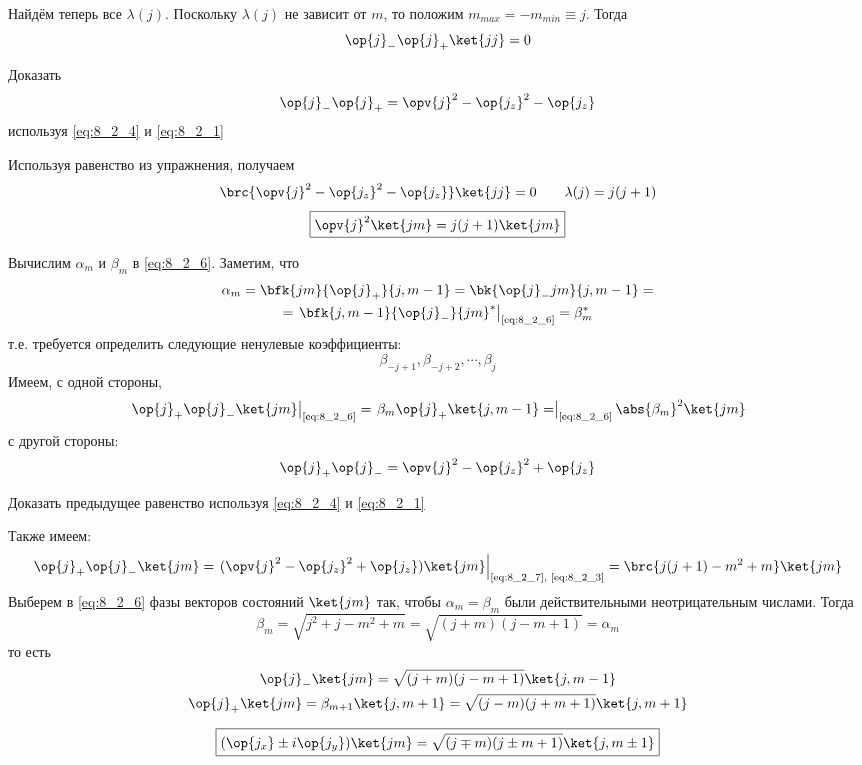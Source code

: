 Найдём теперь все $\lambda(j)$. Поскольку $\lambda(j)$ не зависит от $m$, то положим $m_{max} = -m_{min} \equiv j$. Тогда
$$
\op{j}_{-} \op{j}_{+} \ket{jj} = 0
$$%
%
\begin{excr}
Доказать
$$
\op{j}_{-} \op{j}_{+} = \opv{j}^2 - \op{j_z}^2 - \op{j_z}
$$
используя \eqref{eq:8_2_4} и \eqref{eq:8_2_1}
\end{excr}%
%
Используя равенство из упражнения, получаем
$$
\brc{\opv{j}^2 - \op{j_z}^2 - \op{j_z}} \ket{jj} = 0 ~~~~~~ \lambda(j) = j(j+1)
$$
\begin{equation}
\label{eq:8_2_7}
\boxed {
	\opv{j}^2 \ket{jm} = j(j+1) \ket{jm}
}
\end{equation}

Вычислим $\alpha_m$ и $\beta_m$ в \eqref{eq:8_2_6}. Заметим, что
$$
\begin{gathered}
\alpha_m = \bfk{jm}{\op{j}_{+}}{j, m-1} = \bk{\op{j}_{-}jm}{j, m-1} =\\= \left. \bfk{j,m-1}{\op{j}_{-}}{jm}^* \right|_{\text{\eqref{eq:8_2_6}}} = \beta_m^*
\end{gathered}
$$%
%
т.е. требуется определить следующие ненулевые коэффициенты:
$$
\beta_{-j+1}, \beta_{-j+2}, \cdots, \beta_{j}
$$%
%
Имеем, с одной стороны,
$$
\left. \op{j}_{+} \op{j}_{-} \ket{jm} \right|_{\text{\eqref{eq:8_2_6}}}
= \left. \beta_m \op{j}_{+} \ket{j, m-1} 
= \right|_{\text{\eqref{eq:8_2_6}}} \abs{\beta_m}^2 \ket{jm}
$$%
%
с другой стороны:
$$
\op{j}_{+} \op{j}_{-} = \opv{j}^2 - \op{j_z}^2 + \op{j_z}
$$

\begin{excr}
Доказать предыдущее равенство используя \eqref{eq:8_2_4} и \eqref{eq:8_2_1}
\end{excr}%
%
\noindent
Также имеем:
$$
\op{j}_{+} \op{j}_{-} \ket{jm} = \left. (\opv{j}^2 - \op{j_z}^2 + \op{j_z}) \ket{jm} \right|_{\text{\eqref{eq:8_2_7}, \eqref{eq:8_2_3}}} = \brc{j(j+1) - m^2 + m} \ket{jm}
$$%
%
Выберем в \eqref{eq:8_2_6} фазы векторов состояний $\ket{jm}$ так, чтобы $\alpha_m = \beta_m$ были действительными неотрицательным числами. Тогда
$$
\beta_m = \sqrt{j^2 + j - m^2 + m} = \sqrt{(j+m)(j-m+1)} = \alpha_m
$$%
%
то есть
$$
\begin{gathered}
\op{j}_{-} \ket{jm} = \sqrt{(j+m)(j-m+1)} \ket{j, m-1} \\
\op{j}_{+} \ket{jm} = \beta_{m+1} \ket{j, m+1} = \sqrt{(j-m)(j+m+1)} \ket{j, m+1}
\end{gathered}
$$

\begin{equation}
\label{eq:8_2_8}
\boxed {
	(\op{j_x} \pm i \op{j_y}) \ket{jm} = \sqrt{(j \mp m)(j \pm m + 1)} \ket{j, m \pm 1}
}
\end{equation}



